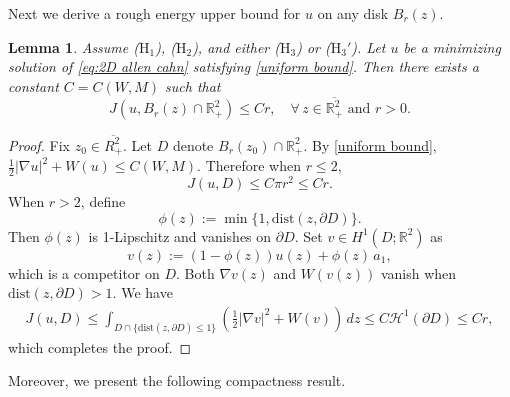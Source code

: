 \documentclass[leqno,11pt]{amsart}
\let\pa=\partial
\let\f=\frac
\let\pa=\partial
\let\na=\nabla
\newtheorem{lemma}[theorem]{Lemma}
\theoremstyle{remark}
\newcommand{\dist}{\mathrm{dist}}
\newcommand{\BR}{\mathbb{R}}
\newcommand{\ch}{\mathcal{H}^1}
\begin{document}
Next we derive a rough energy upper bound for $u$ on any disk $B_r(z)$.
\begin{lemma}\label{lem:rough ene upper bdd}
Assume ($\mathrm{H}_1$), ($\mathrm{H}_2$), and either  ($\mathrm{H}_3$) or ($\mathrm{H}_3'$). Let $u$ be a minimizing solution of \eqref{eq:2D allen cahn} satisfying \eqref{uniform bound}. Then there exists a constant $C=C(W,M)$ such that 
\begin{equation}\label{est: rough upper bdd}
    J(u,B_{r}(z)\cap \BR_+^2)\leq Cr, \quad \forall \,z\in \overline{\BR_+^2} \text{ and }r>0.
\end{equation}
\end{lemma}

\begin{proof}
   Fix $z_0\in \overline{R_+^2}$. Let $D$ denote $B_r(z_0)\cap \BR_+^2$. By \eqref{uniform bound}, $\f12|\na u|^2+W(u)\leq C(W,M)$. Therefore when $r\leq 2$, 
   \begin{equation*}
       J(u,D )\leq C\pi r^2 \leq Cr.
   \end{equation*}
   When $r>2$, define 
   \begin{equation*}
       \phi(z):=\min\{1,\dist\left(z,\pa D\right)\}.
   \end{equation*}
   Then $\phi(z)$ is 1-Lipschitz and vanishes on $\pa D$. Set $v\in H^1(D; \BR^2)$ as
   \begin{equation*}
       v(z):=(1-\phi(z)) u(z)+ \phi(z)\,a_1,
   \end{equation*}
   which is a competitor on $D$. Both $\nabla v(z)$ and $W(v(z))$ vanish when $\dist\left(z,\pa D\right)>1$. We have 
   \begin{align*}
       J(u,D)\leq \int_{D\cap\{\dist(z,\pa D)\leq 1\}} \left(\f12|\na v|^2+W(v)\right)\,dz\leq C\ch(\pa D)\leq Cr,
   \end{align*}
   which completes the proof.
   
\end{proof}

Moreover, we present the following compactness result. 
\end{document}

